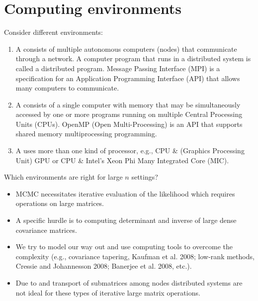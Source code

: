\section{Computing environments}
\begin{frame}
Consider different environments:
\begin{enumerate}\setlength{\itemsep}{0.2cm}
	\item A  consists of multiple autonomous computers (nodes) that communicate through a network. A computer program that runs in a distributed system is called a distributed program. Message Passing Interface (MPI) is a specification for an Application Programming Interface (API) that allows many computers to communicate.\pause
\item A  consists of a
single computer with memory that may be simultaneously
accessed by one or more programs running on multiple
Central Processing Units (CPUs). OpenMP (Open
Multi-Processing) is an API that supports shared memory
multiprocessing programming.
\item A  uses more than one kind of processor, e.g., CPU \& (Graphics Processing Unit) GPU or CPU \& Intel's Xeon Phi Many Integrated Core (MIC). 
\end{enumerate}
\end{frame}

\begin{frame}
Which environments are right for large $n$ settings?
\begin{itemize}\setlength{\itemsep}{0.2cm}
\item MCMC necessitates iterative evaluation of the likelihood which requires
operations on large matrices.
\item A specific hurdle is  to computing determinant and
inverse of large dense covariance matrices.
\item We try to model our way out and use computing tools to overcome the complexity (e.g.,
covariance tapering, Kaufman et al. 2008; low-rank methods,
Cressie and Johannesson 2008; Banerjee et al. 2008, etc.).
\item Due to  and transport of
submatrices among nodes distributed systems are not ideal for
these types of iterative large matrix operations.
\end{itemize}
\end{frame}


